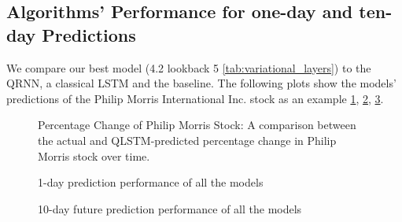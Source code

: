  
\subsection{Algorithms' Performance for one-day and ten-day Predictions}
We compare our best model (4.2 lookback 5 \ref{tab:variational_layers}) to the QRNN, a classical LSTM and the baseline.
The following plots show the models' predictions of the Philip Morris International Inc. stock as an example \ref{fig:PMPercentReturn}, \ref{fig:PM1day}, \ref{fig:PM10day}.

\begin{figure}[!htbp]
  \centering
 \caption{Percentage Change of Philip Morris Stock: A comparison between the actual and QLSTM-predicted percentage change in Philip Morris stock over time.}
 \label{fig:PMPercentReturn}
\end{figure}

\begin{figure}[!htbp]
  \centering
 \caption{1-day prediction performance of all the models}
 \label{fig:PM1day}
\end{figure}

\begin{figure}[!htbp]
  \centering
 \caption{10-day future prediction performance of all the models}
 \label{fig:PM10day}
\end{figure}

